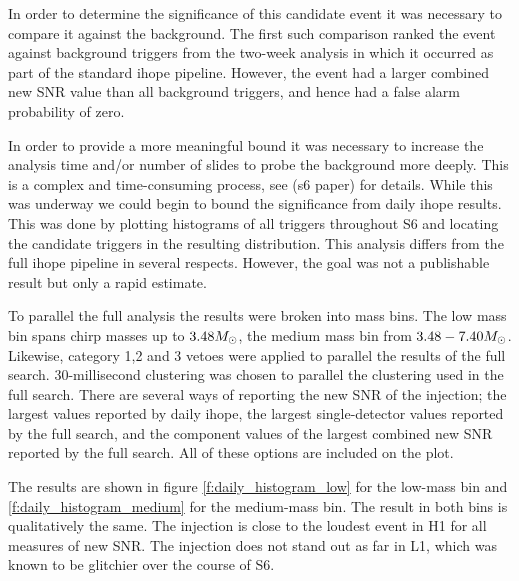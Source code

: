 
In order to determine the significance of this candidate event it was
necessary to compare it against the background.  The first such
comparison ranked the event against background triggers from the
two-week analysis in which it occurred as part of the standard ihope
pipeline.  However, the event had a larger combined new SNR value than
all background triggers, and hence had a false alarm probability of
zero.

In order to provide a more meaningful bound it was necessary to
increase the analysis time and/or number of slides to probe the
background more deeply. This is a complex and time-consuming process,
see (s6 paper) for details.  While this was underway we could begin to
bound the significance from daily ihope results.  This was done by
plotting histograms of all triggers throughout S6 and locating the
candidate triggers in the resulting distribution.  This analysis
differs from the full ihope pipeline in several respects.  However,
the goal was not a publishable result but only a rapid estimate.

To parallel the full analysis the results were broken into mass bins.
The low mass bin spans chirp masses up to $3.48M_\odot$, the medium mass
bin from $3.48-7.40 M_\odot$.  Likewise, category 1,2 and 3 vetoes were
applied to parallel the results of the full search.  30-millisecond
clustering was chosen to parallel the clustering used in the full
search.  There are several ways of reporting the new SNR of the
injection; the largest values reported by daily ihope, the largest
single-detector values reported by the full search, and the component
values of the largest combined new SNR reported by the full search.
All of these options are included on the plot.


The results are shown in figure \ref{f:daily_histogram_low} for the
low-mass bin and \ref{f:daily_histogram_medium} for the medium-mass
bin.  The result in both bins is qualitatively the same.  The
injection is close to the loudest event in H1 for all measures of new
SNR.  The injection does not stand out as far in L1, which was known
to be glitchier over the course of S6.


